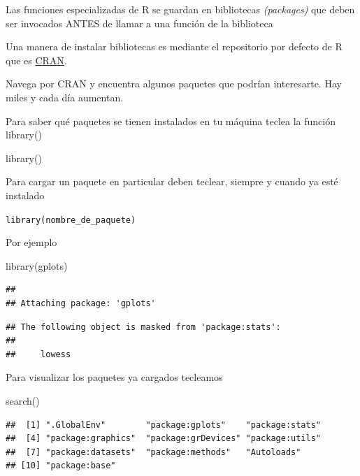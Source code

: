 \documentclass[
]{book}
\newenvironment{Shaded}{\begin{snugshade}}{\end{snugshade}}
\newcommand{\FunctionTok}[1]{\textcolor[rgb]{0.00,0.00,0.00}{#1}}
\newcommand{\NormalTok}[1]{#1}
\begin{document}
Las funciones especializadas de R se guardan en bibliotecas \emph{(packages)} que deben ser invocados ANTES de llamar a una función de la biblioteca

Una manera de instalar bibliotecas es mediante el repositorio por defecto de R que es \href{https://cran.r-project.org/}{CRAN}.

Navega por CRAN y encuentra algunos paquetes que podrían interesarte. Hay miles y cada día aumentan.

Para saber qué paquetes se tienen instalados en
tu máquina teclea la función library()

\begin{Shaded}
\begin{Highlighting}[]
\FunctionTok{library}\NormalTok{()}
\end{Highlighting}
\end{Shaded}

Para cargar un paquete en particular deben teclear, siempre y cuando ya esté instalado

\texttt{library(nombre\_de\_paquete)}

Por ejemplo

\begin{Shaded}
\begin{Highlighting}[]
\FunctionTok{library}\NormalTok{(gplots)  }
\end{Highlighting}
\end{Shaded}

\begin{verbatim}
## 
## Attaching package: 'gplots'
\end{verbatim}

\begin{verbatim}
## The following object is masked from 'package:stats':
## 
##     lowess
\end{verbatim}

Para visualizar los paquetes ya cargados tecleamos

\begin{Shaded}
\begin{Highlighting}[]
\FunctionTok{search}\NormalTok{()}
\end{Highlighting}
\end{Shaded}

\begin{verbatim}
##  [1] ".GlobalEnv"        "package:gplots"    "package:stats"    
##  [4] "package:graphics"  "package:grDevices" "package:utils"    
##  [7] "package:datasets"  "package:methods"   "Autoloads"        
## [10] "package:base"
\end{verbatim}
\end{document}
